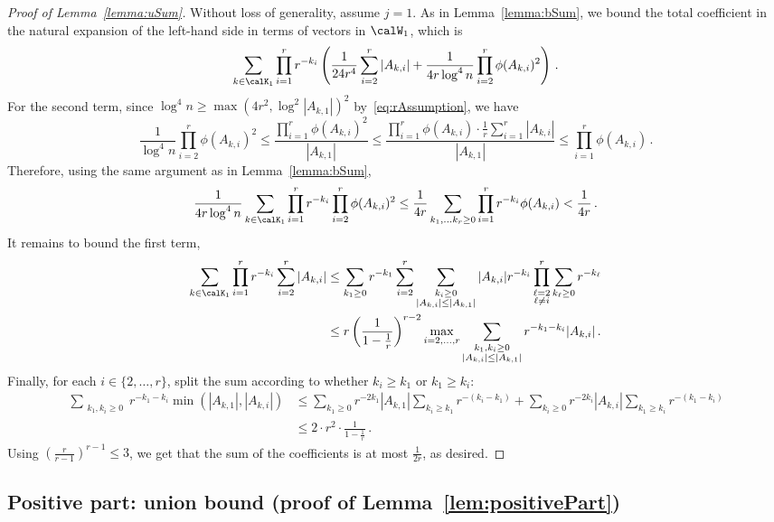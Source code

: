 \documentclass[11pt,a4paper]{article}
\begin{document}
\begin{proof}[Proof of Lemma~\ref{lemma:uSum}]
    Without loss of generality,
    assume $j=1$. As in Lemma~\ref{lemma:bSum}, we bound the total coefficient in the natural expansion of the left-hand side in terms of vectors in $\calW_1$, which is
    \[
        \sum_{k\in \calK_1} \prod_{i=1}^r r^{-k_i}\left(\frac 1 {24r^4}\sum_{i=2}^r |A_{k,i}| + \frac 1 {4r\log^4 n}\prod_{i=2}^r \phi(A_{k,i})^2\right)\,.
    \]
For the second term, since $\log^4 n\ge \max(4r^2, \log^2 |A_{k,1}|)^2$ by~\eqref{eq:rAssumption}, we have
\[
    \frac 1 {\log^4 n}\prod_{i=2}^r \phi(A_{k,i})^2 \le \frac{\prod_{i=1}^r \phi(A_{k,i})^2} {|A_{k,1}|}\le \frac {\prod_{i=1}^r \phi(A_{k,i}) \cdot \frac 1r \sum_{i=1}^r |A_{k,i}|} {|A_{k,1}|} \le \prod_{i=1}^r \phi(A_{k,i})\,.
\]
Therefore, using the same argument as in Lemma~\ref{lemma:bSum},
\[
    \frac 1{4r\log^4 n} \sum_{k\in \calK_1} \prod_{i=1}^r r^{-k_i} \prod_{i=2}^r \phi(A_{k,i})^2\le \frac 1 {4r} \sum_{k_1, \ldots k_r\ge 0} \prod_{i=1}^r  r^{-k_i} \phi(A_{k,i})<\frac 1 {4r}\,.
\]
It remains
to bound the first term,
\begin{align*}
    \sum_{k\in \calK_1} \prod_{i=1}^r r^{-k_i}\sum_{i=2}^r |A_{k,i}|
    &\le 
        \sum_{k_1\ge 0} r^{-k_1}\sum_{i=2}^r \sum_{\substack{k_i\ge 0\\|A_{k,i}|\le |A_{k,1}|}} |A_{k,i}| r^{-k_i} \prod_{\substack{\ell=2\\\ell\neq i}}^r \sum_{k_\ell\ge 0} r^{-k_\ell}\\
        &\le r \left(\frac 1 {1-\frac 1 r}\right)^{r-2} \max_{i=2,\ldots,r}\sum_{\substack{k_1,k_i\ge 0\\|A_{k,i}|\le |A_{k,1}|}} r^{-k_1-k_i}  |A_{k,i}|\,.
    \end{align*}
    Finally, for each $i\in \{2, \ldots, r\}$, 
    split the sum according to whether $k_i\ge k_1$
    or $k_1\ge k_i$:
    \begin{align*}
        \sum_{\substack{k_1,k_i\ge 0}} r^{-k_1-k_i}  \min(|A_{k,1}|,|A_{k,i}|) &\le \sum_{k_1\ge 0} r^{-2k_1} |A_{k,1}| \sum_{k_i\ge k_1} r^{-(k_i-k_1)} + \sum_{k_i\ge 0} r^{-2k_i} |A_{k,i}| \sum_{k_1\ge k_i} r^{-(k_1-k_i)}\\
        &\le 2 \cdot r^2 \cdot \frac 1 {1-\frac 1 r}\,.
    \end{align*}
    Using $\left(\frac {r} {r-1}\right)^{r-1}\le 3$, we get that
    the
    sum of the coefficients is
    at most $\frac 1 {2r}$, as desired.
\end{proof}


\subsection{Positive part: union bound \texorpdfstring{(proof of Lemma~\ref{lem:positivePart})}{}}
\label{sec:proofLast}
\end{document}

